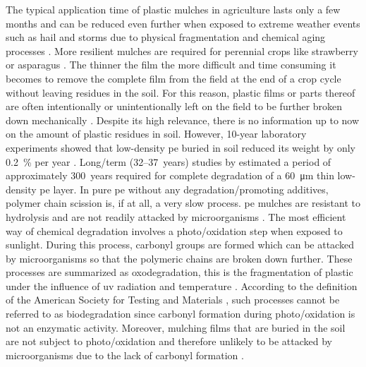 The typical application time of plastic mulches in agriculture lasts only a few months and can be reduced even further when exposed to extreme weather events such as hail and storms due to physical fragmentation and chemical aging processes \citep{Scarascia-MugnozzaPlastic2011}. More resilient mulches are required for perennial crops like strawberry or asparagus \citep{HablotEffect2014}. The thinner the film the more difficult and time consuming it becomes to remove the complete film from the field at the end of a crop cycle without leaving residues in the soil. For this reason, plastic films or parts thereof are often intentionally or unintentionally left on the field to be further broken down mechanically \citep{MorenoImage2014}.
Despite its high relevance, there is no information up to now on the amount of plastic residues in soil. However, \num{10}-year laboratory experiments showed that low-density \ac{pe} buried in soil reduced its weight by only \SI{0.2}{\percent} per year \citep{AlbertssonMechanism1987}. Long\-/term (\numrange{32}{37}~years) studies by \citet{OhtakeStudies1998} estimated a period of approximately \num{300}~years required for complete degradation of a \SI{60}{\micro\meter} thin low-density \ac{pe} layer. In pure \ac{pe} without any degradation\-/promoting additives, polymer chain scission is, if at all, a very slow process. \ac{pe} mulches are resistant to hydrolysis and are not readily attacked by microorganisms \citep{StevensGreen2002}. The most efficient way of chemical degradation involves a photo\-/oxidation step when exposed to sunlight. During this process, carbonyl groups are formed which can be attacked by microorganisms so that the polymeric chains are broken down further. These processes are summarized as oxodegradation, this is the fragmentation of plastic under the influence of \ac{uv} radiation and temperature \citep{SivanNew2011}. According to the definition of the American Society for Testing and Materials \citep{ASTMD5488-94Terminology1994}, such processes cannot be referred to as biodegradation since carbonyl formation during photo\-/oxidation is not an enzymatic activity. Moreover, mulching films that are buried in the soil are not subject to photo\-/oxidation and therefore unlikely to be attacked by microorganisms due to the lack of carbonyl formation \citep{MorenoImage2014}.

